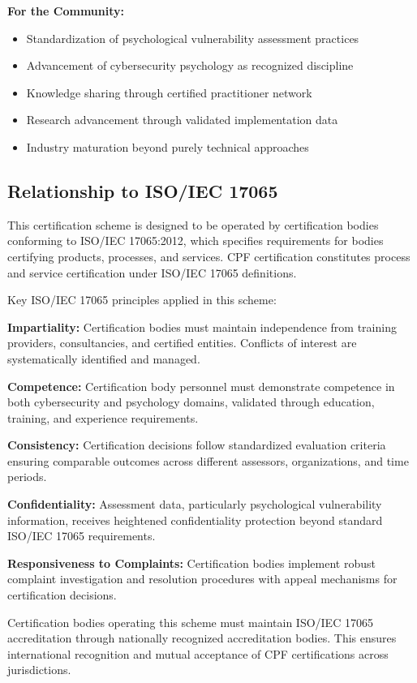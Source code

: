 \documentclass[11pt,a4paper]{article}
\begin{document}
\textbf{For the Community:}
\begin{itemize}
\item Standardization of psychological vulnerability assessment practices
\item Advancement of cybersecurity psychology as recognized discipline
\item Knowledge sharing through certified practitioner network
\item Research advancement through validated implementation data
\item Industry maturation beyond purely technical approaches
\end{itemize}

\subsection{Relationship to ISO/IEC 17065}

This certification scheme is designed to be operated by certification bodies conforming to ISO/IEC 17065:2012, which specifies requirements for bodies certifying products, processes, and services. CPF certification constitutes process and service certification under ISO/IEC 17065 definitions.

Key ISO/IEC 17065 principles applied in this scheme:

\textbf{Impartiality:} Certification bodies must maintain independence from training providers, consultancies, and certified entities. Conflicts of interest are systematically identified and managed.

\textbf{Competence:} Certification body personnel must demonstrate competence in both cybersecurity and psychology domains, validated through education, training, and experience requirements.

\textbf{Consistency:} Certification decisions follow standardized evaluation criteria ensuring comparable outcomes across different assessors, organizations, and time periods.

\textbf{Confidentiality:} Assessment data, particularly psychological vulnerability information, receives heightened confidentiality protection beyond standard ISO/IEC 17065 requirements.

\textbf{Responsiveness to Complaints:} Certification bodies implement robust complaint investigation and resolution procedures with appeal mechanisms for certification decisions.

Certification bodies operating this scheme must maintain ISO/IEC 17065 accreditation through nationally recognized accreditation bodies. This ensures international recognition and mutual acceptance of CPF certifications across jurisdictions.
\end{document}
